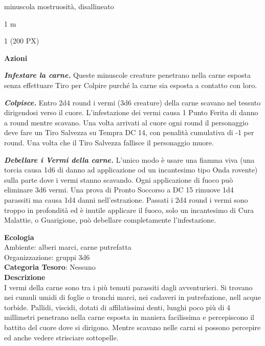 \begin{multicols}{2}
{
\begin{description}[noitemsep, topsep=0pt, parsep=0pt, partopsep=0pt, itemsep=1pt, leftmargin=2.35cm,  labelwidth=2.2cm, itemindent=0cm, listparindent=0pt] %
\setlength{\baselineskip}{10pt}
\item[\textbf{Taglia/Tipo}] minuscola mostruosità, disallineato
\item[\textbf{Caratt.}] 
\item[\textbf{Punti Ferita}] 
\item[\textbf{Movimento}] 1 m
\item[\textbf{Tiri Salvez.}] 
\item[\textbf{Sensi}] 
\item[\textbf{Sfida}] 1 (200 PX)
\end{description}
\smallskip

\textbf{Azioni}

\emph{\textbf{Infestare la carne.}} Queste minuscole creature penetrano nella carne esposta senza effettuare Tiro per Colpire purché la carne sia esposta a contatto con loro.

\emph{\textbf{Colpisce.}} Entro 2d4 round i vermi (3d6 creature) della carne scavano nel tessuto dirigendosi verso il cuore. L'infestazione dei vermi causa 1 Punto Ferita di danno a round mentre scavano. Una volta arrivati al cuore ogni round il personaggio deve fare un Tiro Salvezza su Tempra DC 14, con penalità cumulativa di -1 per round. Una volta che il Tiro Salvezza fallisce il personaggio muore.

\emph{\textbf{Debellare i Vermi della carne.}} L'unico modo è usare una fiamma viva (una torcia causa 1d6 di danno ad applicazione od un incantesimo tipo Onda rovente) sulla parte dove i vermi stanno scavando. Ogni applicazione di fuoco può eliminare 3d6 vermi. Una prova di Pronto Soccorso a DC 15 rimuove 1d4 parassiti ma causa 1d4 danni nell'estrazione. Passati i 2d4 round i vermi sono troppo in profondità ed è inutile applicare il fuoco, solo un incantesimo di Cura Malattie, o Guarigione, può debellare completamente l'infestazione.

\textbf{Ecologia}\\
Ambiente: alberi marci, carne putrefatta\\
Organizzazione: gruppi 3d6\\
\textbf{Categoria Tesoro}: Nessuno\\
\textbf{Descrizione}\\
I vermi della carne sono tra i più temuti parassiti dagli avventurieri. Si trovano nei cumuli umidi di foglie o tronchi marci, nei cadaveri in putrefazione, nell acque torbide. Pallidi, viscidi, dotati di affilatissimi denti, lunghi poco più di 4 millimetri penetrano nella carne esposta in maniera facilissima e percepiscono il battito del cuore dove si dirigono. Mentre scavano nelle carni si possono percepire ed anche vedere strisciare sottopelle.

}
\end{multicols}
